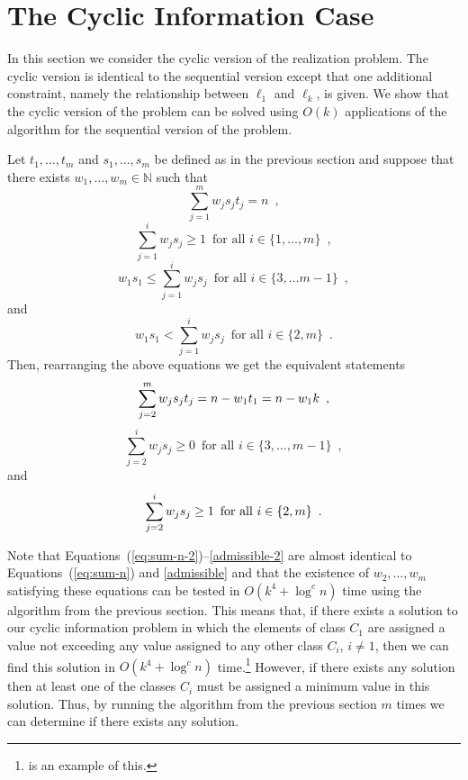 \documentclass[11pt]{patmorin}
\newcommand{\N}{\mathbb{N}}
\begin{document}
\section{The Cyclic Information Case}

In this section we consider the cyclic version of the realization
problem.  The cyclic version is identical to the sequential version
except that one additional constraint, namely the relationship between
$\ell_1$ and $\ell_k$, is given.  We show that the cyclic version of
the problem can be solved using $O(k)$ applications of the algorithm
for the sequential version of the problem.  

Let $t_1,\ldots,t_m$ and $s_1,\ldots,s_m$ be defined as in the
previous section and suppose that there exists $w_1,\ldots,w_m\in\N$ such
that
\[
   \sum_{j=1}^m w_js_jt_j = n \enspace ,
\]
\[
  \sum_{j=1}^i w_js_j \ge 1 \enspace \mbox{for all $i\in \{1,\ldots,m\}$}
   \enspace ,
\]
\[
  w_1s_1 \le \sum_{j=1}^i w_js_j
     \enspace\mbox{for all $i\in\{ 3,\ldots m-1\}$}
     \enspace ,
\] 
and
\[
  w_1s_1 < \sum_{j=1}^i w_js_j
     \enspace\mbox{for all $i\in\{ 2,m\}$}
     \enspace .
\]
Then, rearranging the above equations we get the equivalent statements
\begin{equation}
\sum_{j=2}^m w_js_jt_j = n - w_1t_1 = n-w_1k  \eqlabel{sum-n-2}
\enspace ,
\end{equation}
\begin{equation}
   \sum_{j=2}^i w_js_j \ge 0
       \enspace\mbox{for all $i\in\{3,\ldots,m-1\}$}
       \enspace  , 
\end{equation}
and
\begin{equation}
   \sum_{j=2}^i w_js_j \ge 1
       \enspace\mbox{for all $i\in\{2,m\}$}
       \enspace .  \eqlabel{admissible-2}
\end{equation}

Note that Equations~(\ref{eq:sum-n-2})--\eqref{admissible-2} are
almost identical to Equations~(\ref{eq:sum-n}) and \eqref{admissible}
and that the existence of $w_2,\ldots,w_m$ satisfying these equations
can be tested in $O(k^4+\log^c n)$ time using the algorithm from the
previous section.  This means that, if there exists a solution to our
cyclic information problem in which the elements of class $C_1$ are
assigned a value not exceeding any value assigned to any other class
$C_i$, $i\neq 1$, then we can find this solution in $O(k^4+\log^c n)$
time.\footnote{ is an example of this.}
However, if there exists any solution then at least one of the
classes $C_i$ must be assigned a minimum value in this solution.
Thus, by running the algorithm from the previous section $m$ times we
can determine if there exists any solution.
\end{document}
